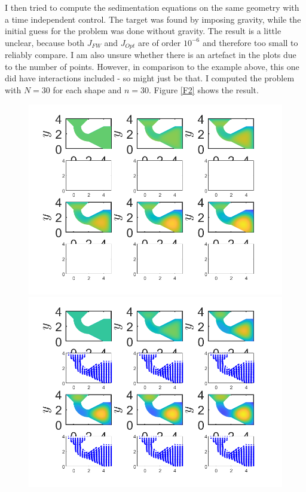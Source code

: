 \documentclass[11pt, a4paper]{article}
\theoremstyle{definition}
\begin{document}
   I then tried to compute the sedimentation equations on the same geometry with a time independent control. The target was found by imposing gravity, while the initial guess for the problem was done without gravity. The result is a little unclear, because both $J_{FW}$ and $J_{Opt}$ are of order $10^{-6}$ and therefore too small to reliably compare. I am also unsure whether there is an artefact in the plots due to the number of points. However, in comparison to the example above, this one did have interactions included - so might just be that. I computed the problem with $N = 30$ for each shape and $n = 30$.
   Figure \ref{F2} shows the result.
   \begin{figure}[h]
   	\centering
   	\includegraphics[scale=0.35]{FW1.png}
   	\includegraphics[scale=0.35]{Opt1.png}

\end{figure}
\end{document}
